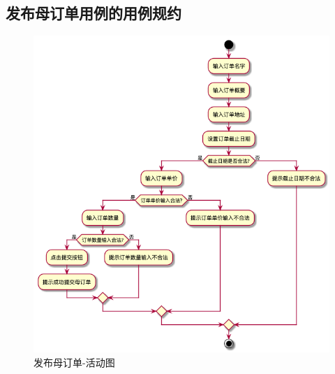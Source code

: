 \subsection{发布母订单用例的用例规约}

\begin{figure}[htp]
        \centering
        \includegraphics[width=16cm]{figure/usecase_v2/fabu.png}
        \caption{发布母订单-活动图}
        \label{fig:put-mon-order-uml}
    \end{figure}

